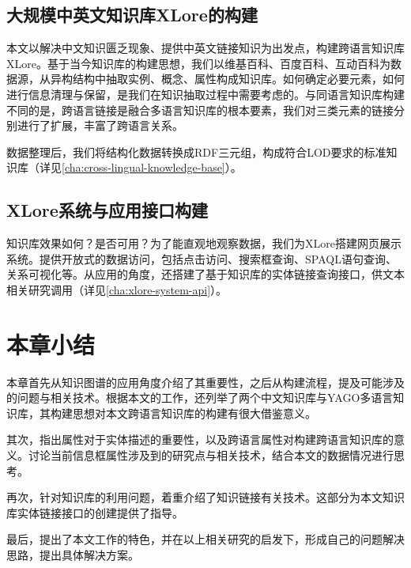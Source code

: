 \subsection{大规模中英文知识库XLore的构建}
本文以解决中文知识匮乏现象、提供中英文链接知识为出发点，构建跨语言知识库XLore。基于当今知识库的构建思想，我们以维基百科、百度百科、互动百科为数据源，从异构结构中抽取实例、概念、属性构成知识库。如何确定必要元素，如何进行信息清理与保留，是我们在知识抽取过程中需要考虑的。与同语言知识库构建不同的是，跨语言链接是融合多语言知识库的根本要素，我们对三类元素的链接分别进行了扩展，丰富了跨语言关系。

数据整理后，我们将结构化数据转换成RDF三元组，构成符合LOD要求的标准知识库（详见\ref{cha:cross-lingual-knowledge-base}）。

\subsection{XLore系统与应用接口构建}

知识库效果如何？是否可用？为了能直观地观察数据，我们为XLore搭建网页展示系统。提供开放式的数据访问，包括点击访问、搜索框查询、SPAQL语句查询、关系可视化等。从应用的角度，还搭建了基于知识库的实体链接查询接口，供文本相关研究调用（详见\ref{cha:xlore-system-api}）。

\section{本章小结}
本章首先从知识图谱的应用角度介绍了其重要性，之后从构建流程，提及可能涉及的问题与相关技术。根据本文的工作，还列举了两个中文知识库与YAGO多语言知识库，其构建思想对本文跨语言知识库的构建有很大借鉴意义。

其次，指出属性对于实体描述的重要性，以及跨语言属性对构建跨语言知识库的意义。讨论当前信息框属性涉及到的研究点与相关技术，结合本文的数据情况进行思考。

再次，针对知识库的利用问题，着重介绍了知识链接有关技术。这部分为本文知识库实体链接接口的创建提供了指导。

最后，提出了本文工作的特色，并在以上相关研究的启发下，形成自己的问题解决思路，提出具体解决方案。

